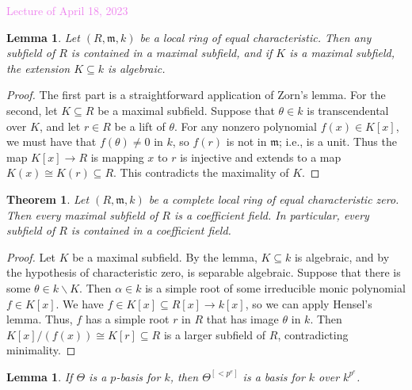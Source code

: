 \documentclass{amsart}[12pt]
\newcommand{\Apr}[1]{\textcolor{violet}{Lecture of April #1, 2023}}
\newcommand{\fm}{{\mathfrak m}}
\numberwithin{equation}{section}
\theoremstyle{plain} %
\newtheorem{thm}[equation]{Theorem}
\newtheorem{lem}[equation]{Lemma}
\theoremstyle{definition}
\theoremstyle{remark}
\begin{document}
\Apr{18}

\begin{lem} Let $(R,\fm,k)$ be a local ring of equal characteristic. Then any subfield of $R$ is contained in a maximal subfield, and if $K$ is a maximal subfield, the extension $K\subseteq k$ is algebraic.
\end{lem}
\begin{proof} The first part is a straightforward application of Zorn's lemma. For the second, let $K\subseteq R$ be a maximal subfield. Suppose that $\theta\in k$ is transcendental over $K$, and let $r\in R$ be a lift of $\theta$. For any nonzero polynomial $f(x)\in K[x]$, we must have that $f(\theta)\neq 0$ in $k$, so $f(r)$ is not in $\fm$; i.e., is a unit. Thus the map $K[x]\to R$ is mapping $x$ to $r$ is injective and extends to a map $K(x) \cong K(r) \subseteq R$. This contradicts the maximality of $K$.
\end{proof}

\begin{thm} Let $(R,\fm,k)$ be a complete local ring of equal characteristic zero. Then every maximal subfield of $R$ is  a coefficient field. In particular, every subfield of $R$ is contained in a coefficient field.
\end{thm}
\begin{proof}
Let $K$ be a maximal subfield. By the lemma, $K\subseteq k$ is algebraic, and by the hypothesis of characteristic zero, is separable algebraic. Suppose that there is some $\theta \in k\smallsetminus K$. Then $\alpha \in k$ is a simple root of some irreducible monic polynomial $f\in K[x]$. We have $f\in K[x]\subseteq R[x] \to k[x]$, so we can apply Hensel's lemma. Thus, $f$ has a simple root $r$ in $R$ that has image $\theta$ in $k$. Then $K[x]/(f(x)) \cong K[r] \subseteq R$ is a larger subfield of $R$, contradicting minimality.
\end{proof} 

\begin{lem} If $\Theta$ is a $p$-basis for $k$, then $\Theta^{[<p^e]}$ is a basis for $k$ over $k^{p^e}$.
\end{lem}
\end{document}
